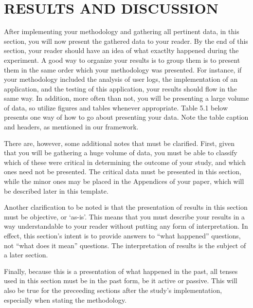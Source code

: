 \chapter{RESULTS AND DISCUSSION}
After implementing your methodology and gathering all pertinent data, in this section, you will now present the gathered data to your reader. By the end of this section, your reader should have an idea of what exactlty happened during the experiment. 
A good way to organize your results is to group them is to present them in the same order which your methodology was presented. For instance, if your methodology included the analysis of user logs, the implementation of an application, and the testing of this application, your results should flow in the same way. In addition, more often than not, you will be presenting a large volume of data, so utilize figures and tables whenever appropriate. Table 5.1 below presents one way of how to go about presenting your data. Note the table caption and headers, as mentioned in our framework.

There are, however, some additional notes that must be clarified. First, given that you will be gathering a huge volume of data, you must be able to classify which of these were critical in determining the outcome of your study, and which ones need not be presented. The critical data must be presented in this section, while the minor ones may be placed in the Appendices of your paper, which will be described later in this template.

Another clarification to be noted is that the presentation of results in this section must be objective, or ‘as-is’. This means that you must describe your results in a way understandable to your reader without putting any form of interpretation. In effect, this section’s intent is to provide answers to “what happened” questions, not “what does it mean” questions. The interpretation of results is the subject of a later section.

Finally, because this is a presentation of what happened in the past, all tenses used in this section must be in the past form, be it active or passive. This will also be true for the preceeding sections after the study’s implementation, especially when stating the methodology.